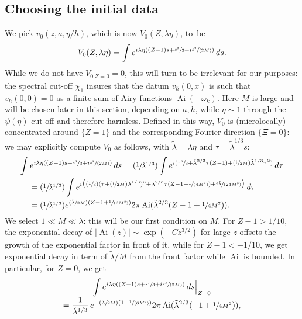 \documentclass[JEP,XML,SOM,Unicode,NoEqCountersInSection,NoFloatCountersInSection,published]{cedram}
\newcommand{\Psfrac}[2]{(\sfrac{#1}{#2})}
\newcommand{\spfrac}[2]{\sfrac{#1}{(#2)}}
\DeclareMathOperator{\Ai}{Ai}
\theoremstyle{plain}
\theoremstyle{definition}
\begin{document}
\subsection{Choosing the initial data}
\label{sec:donnee}
We pick $v_0(z,a,\eta/h)$, which is now $V_0({Z},\lambda \eta)$, to~be
\begin{equation}
\label{eq:53}
V_{0}({Z},\lambda \eta)=\int e^{i\lambda \eta(({Z}-1) s+\sfrac {s^{3}} 3 + i \spfrac {s^{2}}{2M})} \,ds.
\end{equation}
While we do not have $V_{0|{{Z}=0}}=0$, this will turn to be irrelevant for our purposes: the spectral cut-off $\chi_{1}$ insures that the datum $v_{\hbar}(0,x)$ is such that $v_{\hbar}(0,0)=0$ as a finite sum of Airy functions $\Ai(-\omega_{k})$. Here $M$ is large and will be chosen later in this section, depending on $a,h$, while $\eta\sim 1$ through the $\psi(\eta)$ cut-off and therefore harmless. Defined in this way, $V_{0}$ is (microlocally) concentrated around $\{{Z}=1\}$ and the corresponding Fourier direction $\{ \Xi=0\}$: we may explicitly compute $V_0$ as follows, with $\tilde \lambda=\lambda \eta$ and $\tau=\tilde\lambda^{1/3}s$:
\begin{align*}
\int e^{i\lambda \eta(({Z}-1) s+\sfrac {s^{3}} 3 +i \spfrac {s^{2}}{2M})} \,ds& = \Psfrac 1 {\tilde \lambda^{1/3}} \int e^{i(\sfrac {\tau^{3}} 3+ \tilde \lambda^{2/3}\tau({Z} -1)+ \Psfrac i {2M} \tilde \lambda^{1/3} \tau^{2}) }\,d\tau\\
&\hspace*{-4cm} = \Psfrac 1 {\tilde \lambda^{1/3}} \int e^{i\bigl(\Psfrac 13 (\tau+ \Psfrac i {2M} \tilde \lambda^{1/3})^{ 3}+ \tilde \lambda^{2/3}\tau({Z} -1+\spfrac 1 {4M^{2}}) +\spfrac{i\tilde \lambda}{24M^{3}}\bigr)} \,d\tau\\
&\hspace*{-4cm} = \Psfrac 1 {\tilde \lambda^{1/3}} e^{ \Psfrac{\tilde \lambda}{2M} ({Z}-1+\spfrac1 {6M^{2}})} 2\pi \Ai(\tilde \lambda^{2/3}({Z}-1+\sfrac 1 {4M^{2}})).
\end{align*}
We select $1 \ll M\ll \lambda$: this will be our first condition on $M$. For $Z-1>1/10$, the exponential decay of $|\Ai(z)|\sim \exp(-C z^{3/2})$ for large $z$ offsets the growth of the exponential factor in front of it, while for $Z-1<-1/10$, we get exponential decay in term of $\tilde \lambda /M$ from the front factor while $\Ai$ is bounded. In particular, for ${Z}=0$, we get
\begin{multline*}
\label{eq:54}
\int e^{i\lambda \eta(({Z}-1) s+\sfrac {s^{3}} 3 +i \spfrac {s^{2}}{2M})} \,ds\Big|_{{Z}=0}\\[
-3pt]
=\frac 1 {\tilde \lambda^{1/3}}\, e^{ -\Psfrac{\tilde \lambda}{2M} (1-\spfrac1 {6M^{2}})} 2\pi \Ai(\tilde \lambda^{2/3}(-1+\sfrac 1 {4M^{2}})),
\end{multline*}
\end{document}
